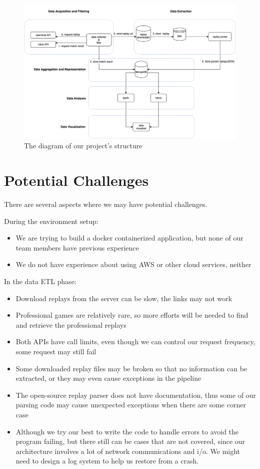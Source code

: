 \documentclass{article}
\begin{document}
\begin{figure}[H]
	\centering
	\includegraphics[width=\linewidth]{pic/arc.png}
	\caption{The diagram of our project's structure}
\end{figure}

\section{Potential Challenges}

There are several aspects where we may have potential challenges.

During the environment setup:

\begin{itemize}
	\item We are trying to build a docker containerized application, but none of our team members have previous experience
	\item We do not have experience about using AWS or other cloud services, neither
\end{itemize}

In the data ETL phase:

\begin{itemize}
	\item Download replays from the server can be slow, the links may not work
	\item Professional games are relatively rare, so more efforts will be needed to find and retrieve the professional replays
	\item Both APIs have call limits, even though we can control our request frequency, some request may still fail
	\item Some downloaded replay files may be broken so that no information can be extracted, or they may even cause exceptions in the pipeline
	\item The open-source replay parser does not have documentation, thus some of our parsing code may cause unexpected exceptions when there are some corner case
	\item Although we try our best to write the code to handle errors to avoid the program failing, but there still can be cases that are not covered, since our architecture involves a lot of network communications and i/o. We might need to design a log system to help us restore from a crash.
\end{itemize}
\end{document}
